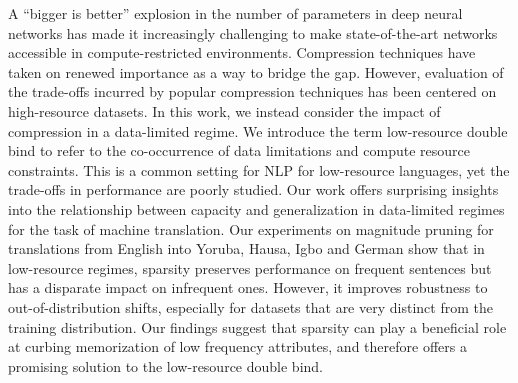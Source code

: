 A ``bigger is better'' explosion in the number of parameters in deep neural networks has made it increasingly challenging to make state-of-the-art networks accessible in compute-restricted environments. Compression techniques have taken on renewed importance as a way to bridge the gap. However, evaluation of the trade-offs incurred by popular compression techniques has been centered on high-resource datasets. In this work, we instead consider the impact of compression in a data-limited regime. We introduce the term low-resource double bind to refer to the co-occurrence of data limitations and compute resource constraints. This is a common setting for NLP for low-resource languages, yet the trade-offs in performance are poorly studied. Our work offers surprising insights into the relationship between capacity and generalization in data-limited regimes for the task of machine translation. Our experiments on magnitude pruning for translations from English into Yoruba, Hausa, Igbo and German show that in low-resource regimes, sparsity preserves performance on frequent sentences but has a disparate impact on infrequent ones. However, it improves robustness to out-of-distribution shifts, especially for datasets that are very distinct from the training distribution. Our findings suggest that sparsity can play a beneficial role at curbing memorization of low frequency attributes, and therefore offers a promising solution to the low-resource double bind.
